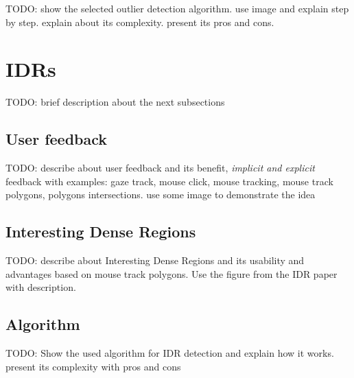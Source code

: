 TODO: show the selected outlier detection algorithm. use image and explain step by step. explain about its complexity. present its pros and cons.

\section{IDRs}

TODO: brief description about the next subsections

\subsection{User feedback}

TODO: describe about user feedback and its benefit, \textit{implicit and explicit} feedback with examples: gaze track, mouse click, mouse tracking, mouse track polygons, polygons intersections. use some image to demonstrate the idea

\subsection{Interesting Dense Regions}

TODO: describe about Interesting Dense Regions and its usability and advantages based on mouse track polygons. Use the figure from the IDR paper with description.

\subsection{Algorithm}

TODO: Show the used algorithm for IDR detection and explain how it works. present its complexity with pros and cons

